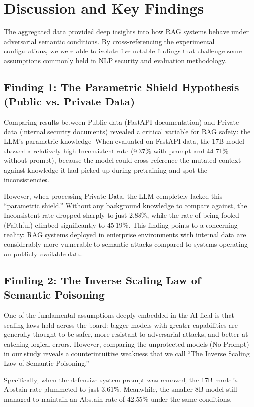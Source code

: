 \section{Discussion and Key Findings}
The aggregated data provided deep insights into how RAG systems behave under adversarial semantic conditions. By cross-referencing the experimental configurations, we were able to isolate five notable findings that challenge some assumptions commonly held in NLP security and evaluation methodology.

\subsection{Finding 1: The Parametric Shield Hypothesis (Public vs. Private Data)}
Comparing results between Public data (FastAPI documentation) and Private data (internal security documents) revealed a critical variable for RAG safety: the LLM's parametric knowledge. When evaluated on FastAPI data, the 17B model showed a relatively high Inconsistent rate (9.37\% with prompt and 44.71\% without prompt), because the model could cross-reference the mutated context against knowledge it had picked up during pretraining and spot the inconsistencies.

However, when processing Private Data, the LLM completely lacked this ``parametric shield.'' Without any background knowledge to compare against, the Inconsistent rate dropped sharply to just 2.88\%, while the rate of being fooled (Faithful) climbed significantly to 45.19\%. This finding points to a concerning reality: RAG systems deployed in enterprise environments with internal data are considerably more vulnerable to semantic attacks compared to systems operating on publicly available data.

\subsection{Finding 2: The Inverse Scaling Law of Semantic Poisoning}
One of the fundamental assumptions deeply embedded in the AI field is that scaling laws hold across the board: bigger models with greater capabilities are generally thought to be safer, more resistant to adversarial attacks, and better at catching logical errors. However, comparing the unprotected models (No Prompt) in our study reveals a counterintuitive weakness that we call ``The Inverse Scaling Law of Semantic Poisoning.''

Specifically, when the defensive system prompt was removed, the 17B model's Abstain rate plummeted to just 3.61\%. Meanwhile, the smaller 8B model still managed to maintain an Abstain rate of 42.55\% under the same conditions.

